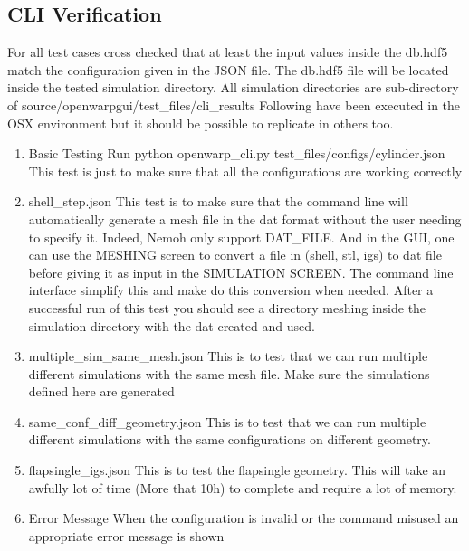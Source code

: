 \documentclass[12pt]{article}
\begin{document}
\subsection{CLI Verification}
For all test cases cross checked that at least the input values inside the db.hdf5 match the configuration given in the JSON file. The db.hdf5 file will be located inside the tested simulation directory. All simulation directories are sub-directory of source/openwarpgui/test_files/cli_results
Following have been executed in the OSX environment but it should be possible to replicate in others too.

\begin{enumerate}
\item Basic Testing
Run python openwarp_cli.py test_files/configs/cylinder.json
This test is just to make sure that all the configurations are working correctly

\item shell_step.json
This test is to make sure that the command line will automatically generate a mesh file in the dat format without the user needing to specify it. Indeed, Nemoh only support DAT_FILE. And in the GUI, one can use the MESHING screen to convert a file in (shell, stl, igs) to dat file before giving
it as input in the SIMULATION SCREEN. The command line interface simplify this and make do this conversion when needed.
After a successful run of this test you should see a directory meshing inside the simulation directory with the dat created and used.

\item multiple_sim_same_mesh.json
This is to test that we can run multiple different simulations with the same mesh file. 
Make sure the simulations defined here are generated

\item same_conf_diff_geometry.json
This is to test that we can run multiple different simulations with the same configurations on different geometry.

\item flapsingle_igs.json
This is to test the flapsingle geometry.
This will take an awfully lot of time (More that 10h) to complete and require a lot of memory.

\item Error Message
When the configuration is invalid or the command misused an appropriate error message is shown

\end{enumerate}
\end{document}
